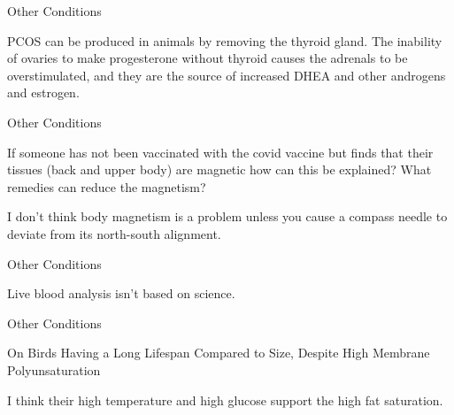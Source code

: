 \documentclass[11pt,oneside,openany,extrafontsizes]{memoir}
\begin{document}
\begin{standalonequote}{Other Conditions}

    \begin{answer}
        PCOS can be produced in animals by removing the thyroid gland. The inability of ovaries to make progesterone without thyroid causes the adrenals to be overstimulated, and they are the source of increased DHEA and other androgens and estrogen.
    \end{answer}
\end{standalonequote}

\begin{qaexchange}{Other Conditions}

    \begin{question}
        If someone has not been vaccinated with the covid vaccine but finds that their tissues (back and upper body) are magnetic how can this be explained? What remedies can reduce the magnetism?
    \end{question}

    \begin{answer}
        I don't think body magnetism is a problem unless you cause a compass needle to deviate from its north-south alignment.
    \end{answer}
\end{qaexchange}

\begin{standalonequote}{Other Conditions}

    \begin{answer}
        Live blood analysis isn't based on science.
    \end{answer}
\end{standalonequote}

\begin{standalonequote}{Other Conditions}

    \begin{note}
        On Birds Having a Long Lifespan Compared to Size, Despite High Membrane Polyunsaturation
    \end{note}

    \begin{answer}
        I think their high temperature and high glucose support the high fat saturation.
    \end{answer}
\end{standalonequote}
\end{document}
